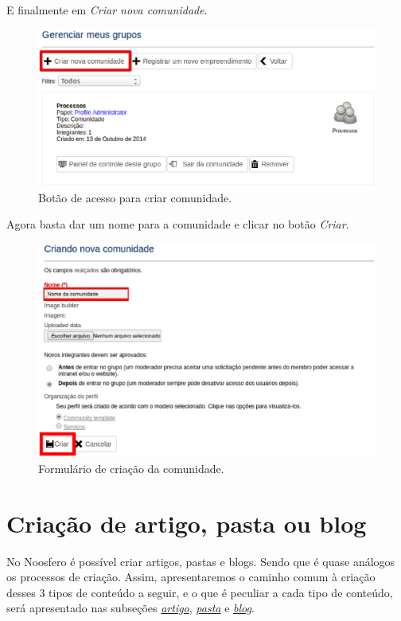 E finalmente em \emph{Criar nova comunidade}.

\begin{figure}[H]
  \centering
    \includegraphics[keepaspectratio=true,scale=0.49]{figuras/gerenciarGrupos.eps}
  \caption{Botão de acesso para criar comunidade.}
  \label{fig:botaoAcesso}
\end{figure}

\newpage
Agora basta dar um nome para a comunidade e clicar no botão \emph{Criar}.

\begin{figure}[H]
  \centering
    \includegraphics[keepaspectratio=true,scale=0.49]{figuras/criandoComunidade.eps}
  \caption{Formulário de criação da comunidade.}
  \label{fig:criandoComunidade}
\end{figure}

\section{Criação de artigo, pasta ou blog}
\label{sec:criarConteudo}

No Noosfero é possível criar artigos, pastas e blogs. Sendo que é quase análogos os processos de criação. Assim, apresentaremos o caminho comum à criação desses 3 tipos de conteúdo a seguir, e o que é peculiar a cada tipo de conteúdo, será apresentado nas subseções \emph{\hyperref[subsec:artigo]{artigo}}, \emph{\hyperref[subsec:pasta]{pasta}} e \emph{\hyperref[subsec:blog]{blog}}.


